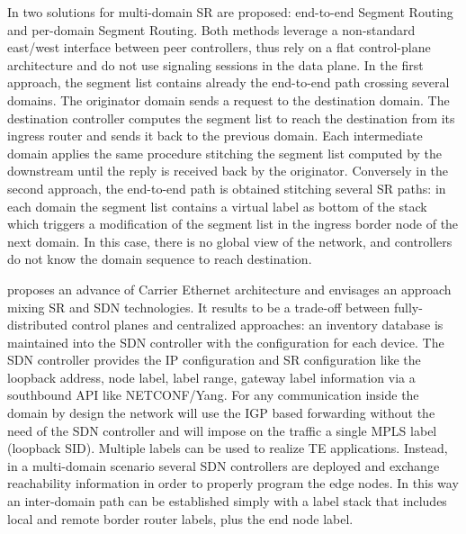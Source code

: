 In \cite{experimentalmulti} two solutions for multi-domain SR are proposed: end-to-end Segment Routing and per-domain Segment Routing. Both methods leverage a non-standard east/west interface between peer controllers, thus rely on a flat control-plane architecture and do not use signaling sessions in the data plane. In the first approach, the segment list contains already the end-to-end path crossing several domains. The originator domain sends a request to the destination domain. The destination controller computes the segment list to reach the destination from its ingress router and sends it back to the previous domain. Each intermediate domain applies the same procedure stitching the segment list computed by the downstream until the reply is received back by the originator. Conversely in the second approach, the end-to-end path is obtained stitching several SR paths: in each domain the segment list contains a virtual label as bottom of the stack which triggers a modification of the segment list in the ingress border node of the next domain. In this case, there is no global view of the network, and controllers do not know the domain sequence to reach destination. %

\cite{evolve} proposes an advance of Carrier Ethernet architecture and envisages an approach mixing SR and SDN technologies. It results to be a trade-off between fully-distributed control planes and centralized approaches: an inventory database is maintained into the SDN controller with the configuration for each device. The SDN controller provides the IP configuration and SR configuration like the loopback address, node label, label range, gateway label information via a southbound API like NETCONF/Yang. 
For any communication inside the domain by design the network will use the IGP based forwarding without the need of the SDN controller and will impose on the traffic a single MPLS label (loopback SID). 
Multiple labels can be used to realize TE applications.
Instead, in a multi-domain scenario several SDN controllers are deployed and exchange reachability information in order to properly program the edge nodes. In this way an inter-domain path can be established simply with a label stack that includes local and remote border router labels, plus the end node label. 

